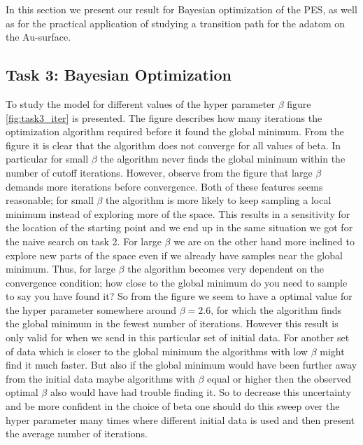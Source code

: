 \documentclass[11pt,a4paper]{article}
\begin{document}
In this section we present our result for Bayesian optimization of the PES, as well as for the practical application of studying a transition path for the adatom on the Au-surface.

\subsection[Task 1]{Task 3: Bayesian Optimization}
\label{sec:results_task3}
To study the model for different values of the hyper parameter $\beta$ figure \ref{fig:task3_iter} is presented. The figure describes how many iterations the optimization algorithm required before it found the global minimum. From the figure it is clear that the algorithm does not converge for all values of beta. In particular for small $\beta$ the algorithm never finds the global minimum within the number of cutoff iterations. However, observe from the figure that large $\beta$ demands more iterations before convergence. Both of these features seems reasonable; for small $\beta$ the algorithm is more likely to keep sampling a local minimum instead of exploring more of the space. This results in a sensitivity for the location of the starting point and we end up in the same situation we got for the naive search on task 2. For large $\beta$ we are on the other hand more inclined to explore new parts of the space even if we already have samples near the global minimum. Thus, for large $\beta$ the algorithm becomes very dependent on the convergence condition; how close to the global minimum do you need to sample to say you have found it? So from the figure we seem to have a optimal value for the hyper parameter somewhere around $\beta = 2.6$, for which the algorithm finds the global minimum in the fewest number of iterations. However this result is only valid for when we send in this particular set of initial data. For another set of data which is closer to the global minimum the algorithms with low $\beta$ might find it much faster. But also if the global minimum would have been further away from the initial data maybe algorithms with $\beta$ equal or higher then the observed optimal $\beta$ also would have had trouble finding it. So to decrease this uncertainty and be more confident in the choice of beta one should do this sweep over the hyper parameter many times where different initial data is used and then present the average number of iterations.
\end{document}
